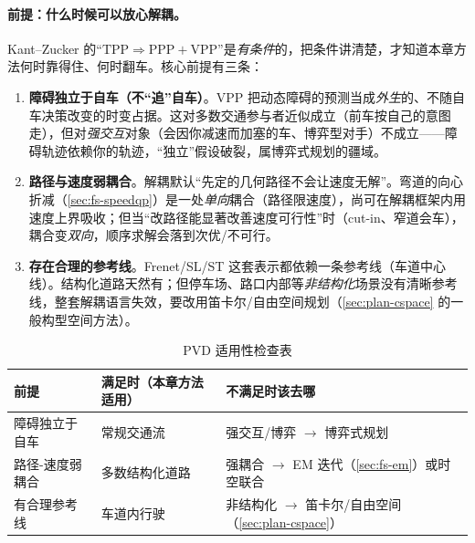\paragraph{前提：什么时候可以放心解耦。}
Kant--Zucker 的“$\text{TPP}\Rightarrow\text{PPP}+\text{VPP}$”是\emph{有条件}的，把条件讲清楚，才知道本章方法何时靠得住、何时翻车。核心前提有三条：
\begin{enumerate}
  \item \textbf{障碍独立于自车（不“追”自车）}。VPP 把动态障碍的预测当成\emph{外生}的、不随自车决策改变的时变占据。这对多数交通参与者近似成立（前车按自己的意图走），但对\emph{强交互}对象（会因你减速而加塞的车、博弈型对手）不成立——障碍轨迹依赖你的轨迹，“独立”假设破裂，属博弈式规划的疆域。
  \item \textbf{路径与速度弱耦合}。解耦默认“先定的几何路径不会让速度无解”。弯道的向心折减（\cref{sec:fs-speedqp}）是一处\emph{单向}耦合（路径限速度），尚可在解耦框架内用速度上界吸收；但当“改路径能显著改善速度可行性”时（cut-in、窄道会车），耦合变\emph{双向}，顺序求解会落到次优/不可行。
  \item \textbf{存在合理的参考线}。Frenet/SL/ST 这套表示都依赖一条参考线（车道中心线）。结构化道路天然有；但停车场、路口内部等\emph{非结构化}场景没有清晰参考线，整套解耦语言失效，要改用笛卡尔/自由空间规划（\cref{sec:plan-cspace} 的一般构型空间方法）。
\end{enumerate}

\begin{table}[H]\centering\small
\caption{PVD 适用性检查表}
\label{tab:fs-applicability}
\begin{tabular}{lll}
\toprule
前提 & 满足时（本章方法适用） & 不满足时该去哪 \\
\midrule
障碍独立于自车 & 常规交通流 & 强交互/博弈 $\to$ 博弈式规划 \\
路径-速度弱耦合 & 多数结构化道路 & 强耦合 $\to$ EM 迭代（\cref{sec:fs-em}）或时空联合 \\
有合理参考线 & 车道内行驶 & 非结构化 $\to$ 笛卡尔/自由空间（\cref{sec:plan-cspace}）\\
\bottomrule
\end{tabular}
\end{table}

